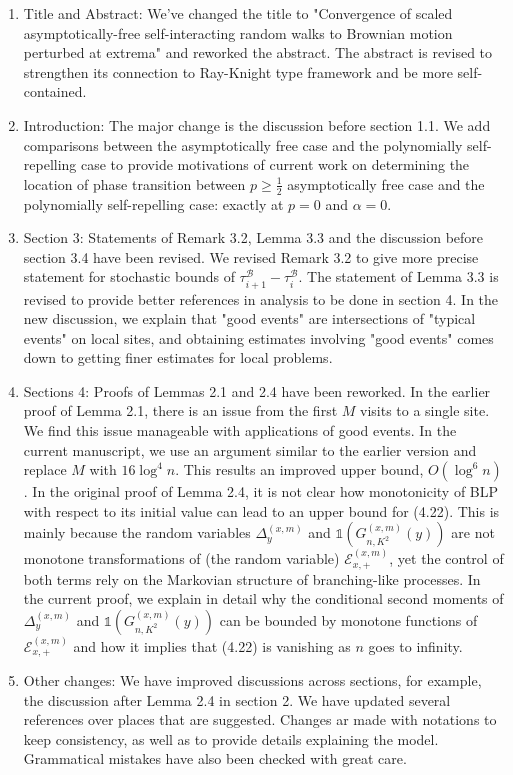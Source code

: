 \documentclass[11pt,a4paper]{article}
\numberwithin{equation}{section}
\begin{document}
	\begin{enumerate}
		\item Title and Abstract: We've changed the title to "Convergence of scaled asymptotically-free
		self-interacting random walks to Brownian motion
		perturbed at extrema" and reworked the abstract. The abstract is revised to strengthen its connection to Ray-Knight type framework and be more self-contained.
		
		\item Introduction: The major change is the discussion before section 1.1. We add comparisons between the asymptotically free case and the polynomially self-repelling case to provide motivations of current work on determining the location of phase transition between $p\geq \frac{1}{2}$ asymptotically free case and the polynomially self-repelling case: exactly at $p = 0$ and $\alpha = 0$.
		
		\item Section 3:  Statements of Remark 3.2, Lemma 3.3 and the discussion before section 3.4 have been revised. We revised Remark 3.2 to give more precise statement for stochastic bounds of $\tau_{i+1}^{\mathcal{B}}-\tau_{i}^{\mathcal{B}}$. The statement of Lemma 3.3 is revised to provide better references in analysis to be done in section 4.
		In the new discussion, we explain that "good events" are intersections of "typical events" on local sites, and obtaining estimates involving "good events" comes down to getting finer estimates for local problems.
		
		
		
		\item Sections 4: Proofs of Lemmas 2.1 and 2.4 have been reworked. In the earlier proof of Lemma 2.1, there is an issue from the first $M$ visits to a single site. We find this issue manageable with applications of good events. In the current manuscript, we use an argument similar to the earlier version and replace $M$ with $16\log^4 n$. This results an improved upper bound, $O(\log^6 n)$. In the original proof of Lemma 2.4, it is not clear how monotonicity of BLP with respect to its initial value can lead to an upper bound for (4.22). This is mainly because the random variables $\Delta_{y}^{(x,m)}$ and $\mathbb{1}\left(G^{(x,m)}_{n,K^2}(y) \right)$ are not monotone transformations of (the random variable) $\mathcal{E}^{(x,m)}_{x,+}$, yet the control of both terms rely on the Markovian structure of branching-like processes. In the current proof, we explain in detail why the conditional second moments of $\Delta_{y}^{(x,m)}$ and $\mathbb{1}\left(G^{(x,m)}_{n,K^2}(y) \right)$ can be bounded by monotone functions of $\mathcal{E}^{(x,m)}_{x,+}$ and how it implies that (4.22) is vanishing as $n$ goes to infinity.  
		
		\item Other changes: We have improved discussions across sections, for example, the discussion after Lemma 2.4 in section 2. We have updated several references over places that are suggested. Changes ar made with notations to keep consistency, as well as to provide details explaining the model. Grammatical mistakes have also been checked with great care.  
		
	\end{enumerate}
	
\end{document}
